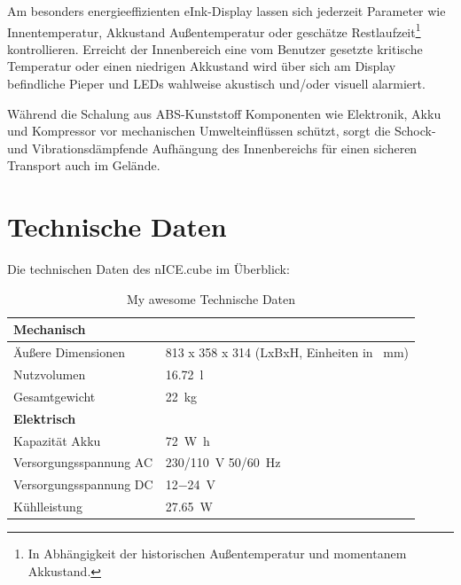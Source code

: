 	Am besonders energieeffizienten eInk-Display lassen sich jederzeit Parameter wie Innentemperatur, Akkustand Außentemperatur oder geschätze Restlaufzeit\footnote{In Abhängigkeit der
	historischen Außentemperatur und momentanem Akkustand.} kontrollieren. Erreicht der Innenbereich eine vom Benutzer gesetzte kritische Temperatur oder einen niedrigen Akkustand
	wird über sich am Display befindliche Pieper und LEDs wahlweise akustisch und/oder visuell alarmiert.\par\smallskip

	Während die Schalung aus ABS-Kunststoff Komponenten wie Elektronik, Akku und Kompressor vor mechanischen Umwelteinflüssen schützt, sorgt die Schock- und Vibrationsdämpfende Aufhängung
	des Innenbereichs für einen sicheren Transport auch im Gelände.
	\clearpage
	\section{Technische Daten}
		Die technischen Daten des \frq nICE.cube\flq{} im Überblick:\
		\begin{table}[h]
			\centering
			\caption{My awesome Technische Daten}
			\begin{tabular}{@{}p{}p{}@{}}
				\toprule
				\textbf{Mechanisch} & \\
				\midrule
				Äußere Dimensionen & 813 x 358 x 314 (LxBxH, Einheiten in \SI{}{\milli\metre})\\
				Nutzvolumen & \SI{16,72}{\litre}\\
				Gesamtgewicht & \SI{22}{\kilo\gram}\\
				\midrule
				\textbf{Elektrisch} & \\
				\midrule
				Kapazität Akku & \SI{72}{\watt\hour}\\
				Versorgungsspannung AC & \SI{230/110}{\volt} \SI{50/60}{\hertz}\\
				Versorgungsspannung DC & \SI{12-24}{\volt}\\
				Kühlleistung & \SI{27,65}{\watt} \cite{Kompressor.datenblatt.Masterflux.20210727}\\

				\bottomrule
			\end{tabular}
			\label{tab:tech daten}
		\end{table}